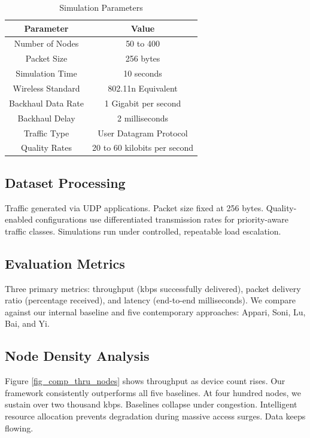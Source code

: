 \documentclass[a4paper,fleqn]{cas-dc}
\numberwithin{equation}{section}
\begin{document}
\begin{table}[htbp]
\caption{Simulation Parameters}
\label{tab_simulation_parameters}
\centering
\begin{tabular}{|c|c|}
\hline
Parameter & Value \\
\hline
Number of Nodes & 50 to 400 \\
Packet Size & 256 bytes \\
Simulation Time & 10 seconds \\
Wireless Standard & 802.11n Equivalent \\
Backhaul Data Rate & 1 Gigabit per second \\
Backhaul Delay & 2 milliseconds \\
Traffic Type & User Datagram Protocol \\
Quality Rates & 20 to 60 kilobits per second \\
\hline
\end{tabular}
\end{table}

\subsection{Dataset Processing}

Traffic generated via UDP applications. Packet size fixed at 256 bytes. Quality-enabled configurations use differentiated transmission rates for priority-aware traffic classes. Simulations run under controlled, repeatable load escalation.

\subsection{Evaluation Metrics}

Three primary metrics: throughput (kbps successfully delivered), packet delivery ratio (percentage received), and latency (end-to-end milliseconds). We compare against our internal baseline and five contemporary approaches: Appari, Soni, Lu, Bai, and Yi.

\subsection{Node Density Analysis}

Figure \ref{fig_comp_thru_nodes} shows throughput as device count rises. Our framework consistently outperforms all five baselines. At four hundred nodes, we sustain over two thousand kbps. Baselines collapse under congestion. Intelligent resource allocation prevents degradation during massive access surges. Data keeps flowing.
\end{document}
